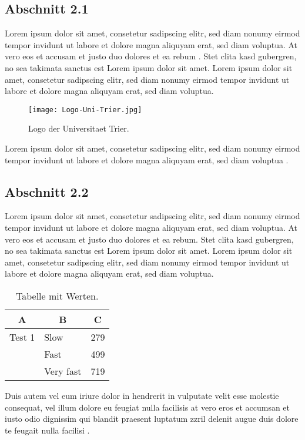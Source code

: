 \subsection{Abschnitt 2.1}
\label{ch:XYZ:sec:Abschnitt2:subsec:Abschnitt2-1}
Lorem ipsum dolor sit amet, consetetur sadipscing elitr, sed diam nonumy eirmod
tempor invidunt ut labore et dolore magna aliquyam erat, sed diam voluptua. At
vero eos et accusam et justo duo dolores et ea rebum \cite{TB2000}. Stet clita
kasd gubergren, no sea takimata sanctus est Lorem ipsum dolor sit amet.
Lorem ipsum dolor sit amet, consetetur sadipscing elitr, sed diam nonumy eirmod
tempor invidunt ut labore et dolore magna \cite{stenz85:_about_time} aliquyam
erat, sed diam voluptua.
\begin{figure}[htb]
\centering
  	{\texttt{[image: Logo-Uni-Trier.jpg]}}
	\caption{Logo der Universitaet Trier.\label{fig:grafik1}}
\centering
\end{figure}
Lorem ipsum dolor sit amet, consetetur sadipscing elitr, sed diam nonumy eirmod
tempor invidunt ut labore et dolore magna aliquyam erat, sed diam voluptua
\cite{mcdysan}.

\subsection{Abschnitt 2.2}
\label{ch:XYZ:sec:Abschnitt2:subsec:Abschnitt2-2}
Lorem ipsum dolor sit amet, consetetur sadipscing elitr, sed diam nonumy eirmod
tempor invidunt ut labore et dolore magna aliquyam erat, sed diam voluptua. At
vero eos et accusam et justo duo dolores et ea rebum. Stet clita
kasd gubergren, no sea takimata sanctus est Lorem ipsum dolor sit amet.
Lorem ipsum dolor sit amet, consetetur sadipscing elitr, sed diam nonumy eirmod
tempor invidunt ut labore et dolore magna aliquyam erat, sed diam voluptua.
\begin{table}[htb]
\caption{Tabelle mit Werten.\label{tab:liste}}
\vspace*{1em}
\centering

\bgroup
\def\arraystretch{1.3}%

\begin{tabular}[c]{l|l|c}
	
	\multicolumn{1}{c|}{\textbf{A}} & 
	\multicolumn{1}{c|}{\textbf{B}} & 
	\multicolumn{1}{c}{\textbf{C}} \\ 
	
	\hline

	Test 1& Slow& 279 \\ 
	&Fast & 499 \\ 
	&Very fast& 719 \\ 
	
\end{tabular}

\egroup

\end{table}
Duis autem vel eum iriure dolor in hendrerit in vulputate velit esse molestie
consequat, vel illum dolore eu feugiat nulla facilisis at vero eros et accumsan
et iusto odio dignissim qui blandit praesent luptatum zzril delenit augue duis
dolore te feugait nulla facilisi \cite{ref2}.


